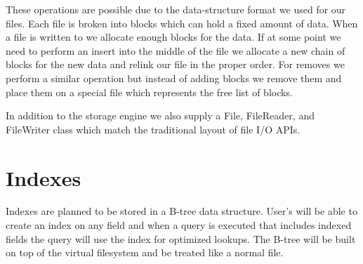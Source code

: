 \documentclass{article}
\begin{document}
These operations are possible due to the data-structure format we used for our files.
Each file is broken into blocks which can hold a fixed amount of data.
When a file is written to we allocate enough blocks for the data.
If at some point we need to perform an insert into the middle of the file we allocate
a new chain of blocks for the new data and relink our file in the proper order.
For removes we perform a similar operation but instead of adding blocks we remove them and 
place them on a special file which represents the free list of blocks.

In addition to the storage engine we also supply a File, FileReader, and FileWriter class which
match the traditional layout of file I/O APIs.

\section{Indexes}

Indexes are planned to be stored in a B-tree data structure.  User's will be able to create an index on any field and
when a query is executed that includes indexed fields the query will use the index for optimized lookups.  The B-tree
will be built on top of the virtual filesystem and be treated like a normal file.
\end{document}
